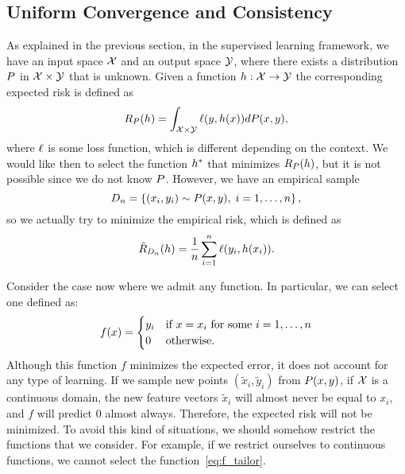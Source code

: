 \subsection{Uniform Convergence and Consistency}
%
As explained in the previous section, in the supervised learning framework, we have an input space $\mathcal{X}$ and an output space $\mathcal{Y}$, where there exists a distribution $P$ in $\mathcal{X} \times \mathcal{Y}$ that is unknown. Given a function $h: \mathcal{X} \to \mathcal{Y}$ the corresponding expected risk is defined as
\begin{equation}
    \nonumber %
    \exprisk(\hypf) = \int_{\Xspace \times \Yspace} \ell(y, \hypf(x)) d\distf(x, y) ,
\end{equation}
where $\ell$ is some loss function, which is different depending on the context.
%
We would like then to select the function ${h}^*$ that minimizes $R_P(h)$, but it is not possible since we do not know $P$. However, we have an empirical sample 
$$ D_{n} = \left\{(x_i, y_i) \sim P(x, y), \; i=1, \ldots, n\right\} ,$$
so we actually try to minimize the empirical risk, which is defined as
\begin{equation}
    \nonumber %
    \empriskn(\hypf) = \frac{1}{\nsamples} \sum_{i=1}^\nsamples \ell(y_i, \hypf(x_i)) .
\end{equation}

Consider the case now where we admit any function. In particular, we can select one defined as: 
\begin{equation}
    \label{eq:f_tailor}
    f(x) = 
    \begin{cases}
        y_i & \text{if } x = x_i \text{ for some } i = 1, \ldots, \nsamples \\
        0 & \text{otherwise}.
    \end{cases}
\end{equation}
Although this function $f$ minimizes the expected error, it does not account for any type of learning. If we sample new points $(\tilde{x}_i, \tilde{y}_i)$ from $P(x, y)$, if $\mathcal{X}$ is a continuous domain, the new feature vectors $\tilde{x}_i$ will almost never be equal to $x_i$, and $f$ will predict $0$ almost always. Therefore, the expected risk will not be minimized.
%
To avoid this kind of situations, we should somehow restrict the functions that we consider. For example, if we restrict ourselves to continuous functions, we cannot select the function~\eqref{eq:f_tailor}.   


